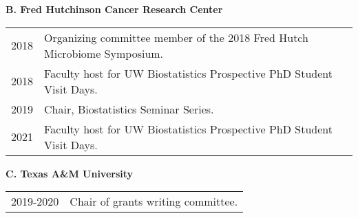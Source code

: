 \documentclass[10pt]{article}
\begin{document}
\textbf{B. Fred Hutchinson Cancer Research Center}
\begin{table}[H]
\hskip0.9cm\begin{tabular}{p{1.6cm}p{12cm}}
2018 & Organizing committee member of the 2018 Fred Hutch Microbiome Symposium.\\
2018 & Faculty host for UW Biostatistics Prospective PhD Student Visit Days.\\
2019 & Chair, Biostatistics Seminar Series.\\
2021 & Faculty host for UW Biostatistics Prospective PhD Student Visit Days. 
\end{tabular}
\end{table}


\textbf{C. Texas A\&M University }
\begin{table}[H]
\hskip0.9cm\begin{tabular}{p{1.6cm}p{12cm}}
2019-2020 & Chair of grants writing committee.
\end{tabular}
\end{table}
\end{document}
